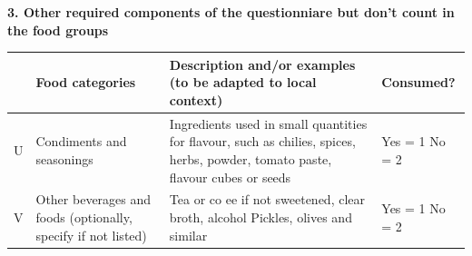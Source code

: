 \documentclass[12pt,]{book}
\theoremstyle{definition}
\theoremstyle{definition}
\theoremstyle{definition}
\theoremstyle{remark}
\begin{document}
\textbf{3. Other required components of the questionniare but don't
count in the food groups}

\begin{longtable}[]{@{}clll@{}}
\toprule
\begin{minipage}[b]{0.05\columnwidth}\centering
\strut
\end{minipage} & \begin{minipage}[b]{0.18\columnwidth}\raggedright
\textbf{Food categories}\strut
\end{minipage} & \begin{minipage}[b]{0.54\columnwidth}\raggedright
\textbf{Description and/or examples (to be adapted to local
context)}\strut
\end{minipage} & \begin{minipage}[b]{0.12\columnwidth}\raggedright
\textbf{Consumed?}\strut
\end{minipage}\tabularnewline
\midrule
\endhead
\begin{minipage}[t]{0.05\columnwidth}\centering
U\strut
\end{minipage} & \begin{minipage}[t]{0.18\columnwidth}\raggedright
Condiments and seasonings\strut
\end{minipage} & \begin{minipage}[t]{0.54\columnwidth}\raggedright
Ingredients used in small quantities for flavour, such as chilies,
spices, herbs, powder, tomato paste, flavour cubes or seeds\strut
\end{minipage} & \begin{minipage}[t]{0.12\columnwidth}\raggedright
Yes = 1 No = 2\strut
\end{minipage}\tabularnewline
\begin{minipage}[t]{0.05\columnwidth}\centering
V\strut
\end{minipage} & \begin{minipage}[t]{0.18\columnwidth}\raggedright
Other beverages and foods (optionally, specify if not listed)\strut
\end{minipage} & \begin{minipage}[t]{0.54\columnwidth}\raggedright
Tea or co ee if not sweetened, clear broth, alcohol Pickles, olives and
similar\strut
\end{minipage} & \begin{minipage}[t]{0.12\columnwidth}\raggedright
Yes = 1 No = 2\strut
\end{minipage}\tabularnewline
\bottomrule
\end{longtable}
\end{document}
